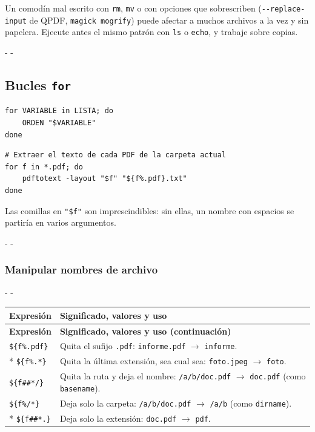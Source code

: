 \documentclass[11pt,a4paper]{article}
\makeatletter
\newcommand{\necesitaespacio}[1]{\par\penalty-100\begingroup
	\setlength{\dimen@}{#1}\dimen@ii\pagegoal\advance\dimen@ii-\pagetotal
	\ifdim\dimen@>\dimen@ii\ifdim\dimen@ii>\z@\vfil\fi\penalty-\@M\fi\endgroup}
\newenvironment{opciones}[1][Opción]{%
	\par\begingroup\small
	\begin{longtable}{L{4.25cm}L{11.2cm}}
		\toprule\rowcolor{tablacab}\cab{#1} & \cab{Significado, valores y uso} \\ \midrule
		\endfirsthead
		\toprule\rowcolor{tablacab}\cab{#1} & \cab{Significado, valores y uso (continuación)} \\ \midrule
		\endhead
		\bottomrule
		\endfoot}
	{\end{longtable}\endgroup}
\newcommand{\cmd}[1]{\texttt{\textcolor{colcmd}{#1}}}      %
\newcommand{\opt}[1]{\texttt{\textcolor{colopt}{#1}}}      %
\newcommand{\arch}[1]{\texttt{\textcolor{colarch}{#1}}}    %
\newcommand{\cab}[1]{\textbf{#1}}
\makeatother
\begin{document}
	\begin{advertencia}
		Un comodín mal escrito con \cmd{rm}, \cmd{mv} o con opciones que sobrescriben (\opt{-{}-replace-\allowbreak{}input} de QPDF, \cmd{magick mogrify}) puede afectar a muchos archivos a la vez y sin papelera. Ejecute antes el mismo patrón con \cmd{ls} o \cmd{echo}, y trabaje sobre copias.
	\end{advertencia}
	
	\necesitaespacio{8\baselineskip}
	\subsection{Bucles \texttt{for}}
	
	\begin{lstlisting}[style=sintaxis]
for VARIABLE in LISTA; do
    ORDEN "$VARIABLE"
done
\end{lstlisting}
	
	\begin{lstlisting}
# Extraer el texto de cada PDF de la carpeta actual
for f in *.pdf; do
    pdftotext -layout "$f" "${f%.pdf}.txt"
done
\end{lstlisting}
	
	Las comillas en \texttt{"\$f"} son imprescindibles: sin ellas, un nombre con espacios se partiría en varios argumentos.
	
	\necesitaespacio{18\baselineskip}
	\subsubsection{Manipular nombres de archivo}
	
	\necesitaespacio{14\baselineskip}
	\begin{opciones}[Expresión]
		\texttt{\$\{f\%.pdf\}} & Quita el sufijo \texttt{.pdf}: \arch{informe.pdf} $\rightarrow$ \arch{informe}.\\*
		\texttt{\$\{f\%.*\}} & Quita la última extensión, sea cual sea: \arch{foto.jpeg} $\rightarrow$ \arch{foto}.\\
		\texttt{\$\{f\#\#*/\}} & Quita la ruta y deja el nombre: \arch{/a/b/doc.pdf} $\rightarrow$ \arch{doc.pdf} (como \cmd{basename}).\\
		\texttt{\$\{f\%/*\}} & Deja solo la carpeta: \arch{/a/b/doc.pdf} $\rightarrow$ \arch{/a/b} (como \cmd{dirname}).\\*
		\texttt{\$\{f\#\#*.\}} & Deja solo la extensión: \arch{doc.pdf} $\rightarrow$ \arch{pdf}.\\
	\end{opciones}
	
\end{document}
